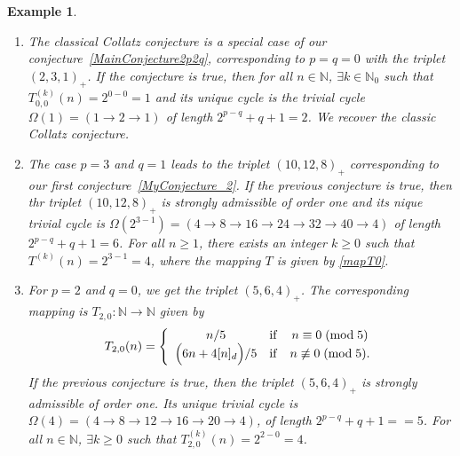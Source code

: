 \documentclass[11pt,a4paper]{article}
\newtheorem{example}{Example}[section]
\newcommand*\modd[3]{#1\equiv#2\;( {\rm mod}\;  #3)}
\newcommand*\notmodd[3]{#1\not\equiv#2\;( {\rm mod}\;  #3)}
\begin{document}
\begin{example}
	\begin{enumerate}
		\item  The classical Collatz conjecture is a special case of our conjecture~\ref{MainConjecture2p2q},  corresponding to $p=q=0$ with the triplet $(2,3,1)_{\pmb{+}}$.  If the conjecture is true, then for all
		$ n\in\mathbb{N}$, $\exists k\in \mathbb{N}_0$ such that  $T_{0,0}^{(k)}(n)=2^{0-0}=1$ and its unique cycle is the trivial cycle $\Omega(1)=(1\rightarrow 2\rightarrow 1)$ of length $2^{p-q}+q+1=2$. We recover the classic Collatz conjecture. 
		
		\item The case  $p=3$ and $q=1$  leads to the triplet $(10,12,8)_{\pmb{+}}$ corresponding to  our first conjecture~\ref{MyConjecture_2}.  If the previous conjecture is true, then  thr triplet $(10,12,8)_{\pmb{+}}$ is  strongly  admissible   of order one and  its nique trivial cycle is 
		$\Omega(2^{3-1})=(4\rightarrow 8\rightarrow 16\rightarrow 24\rightarrow32\rightarrow40\rightarrow4)$ of length $2^{p-q}+q+1=6$. For all $n\geq 1$, there exists an integer $k\geq 0$ such that $T^{(k)}(n)=2^{3-1}=4$, where the mapping $T$ is given by \eqref{mapT0}.
		
		\item 	For $p=2$ and $q=0$, we get   the triplet $(5,6,4)_+$. The  corresponding 
		mapping  is $T_{2,0}:\mathbb{N}\longrightarrow \mathbb{N} $ given  by
		\begin{equation}\label{mapT_Exp2}
			T_{2,0}(n)=\left\{\begin{array}{ccc}
				n/5&\mathrm{if}& \modd{n}{0}{5}\\ 
				\Bigl(6 n+4 [ n]_d\Bigr)/5&\mathrm{if}& \notmodd{n}{0}{5}.\\
			\end{array}\right.
		\end{equation}
		If the previous conjecture is true, then the triplet
		$(5,6,4)_+$  is strongly admissible  of order one. Its unique  trivial cycle is
		$\Omega(4)=(4\rightarrow 8\rightarrow 12\rightarrow 16\rightarrow 20\rightarrow 4)$,  of length $2^{p-q}+q+1==5$.  For all
		$ n\in\mathbb{N}$, $\exists k\geq 0$ such that  $T_{2,0}^{(k)}(n)=2^{2-0}=4$.  
		

\end{enumerate}
\end{example}
\end{document}
